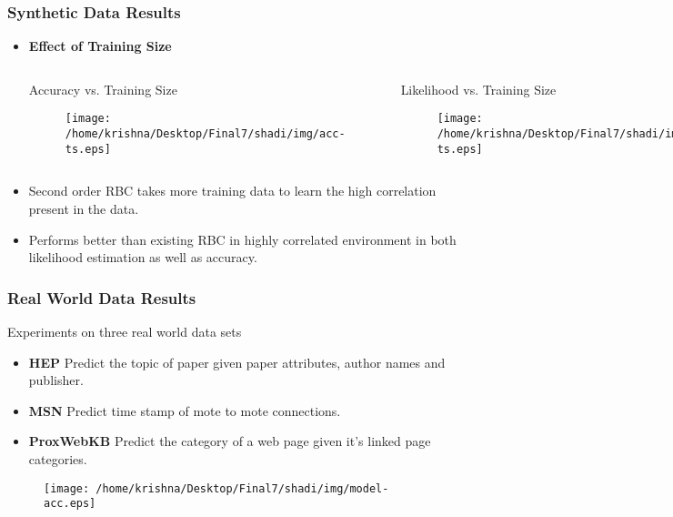 \documentclass[10pt, blue,subsection=true, compress]{beamer}
\begin{document}
\begin{frame}\frametitle{Synthetic Data Results}
\begin{itemize}
\item \textbf{Effect of Training Size}
\begin{columns}[t]

\begin{block}{Accuracy vs. Training Size}
\begin{figure}[htbp]
\centering
\texttt{[image: /home/krishna/Desktop/Final7/shadi/img/acc-ts.eps]}
\end{figure}
\end{block}


\begin{block}{Likelihood vs. Training Size}
\begin{figure}[htbp]
\centering
\texttt{[image: /home/krishna/Desktop/Final7/shadi/img/lh-ts.eps]}
\end{figure}

\end{block}
\end{columns}
\end{itemize}
\begin{itemize}
\item Second order RBC takes more training data to learn the high correlation present in the data.
\item Performs better than existing RBC in highly correlated environment
in both likelihood estimation as well as accuracy.
\end{itemize}
\end{frame}

\begin{frame}\frametitle{Real World Data Results}
\begin{block}{Experiments on three real world data sets}
\begin{itemize}
\item \textbf{HEP}
Predict the topic of paper given paper attributes, author names and
 publisher. 
 \item \textbf{MSN} Predict time stamp of mote to mote connections. 
 \item \textbf{ProxWebKB} Predict the category of a web page given it's linked page categories.
\end{itemize}
\end{block}
\begin{figure}[htbp]
\centering
\texttt{[image: /home/krishna/Desktop/Final7/shadi/img/model-acc.eps]}
\end{figure}
\end{frame}
\end{document}

